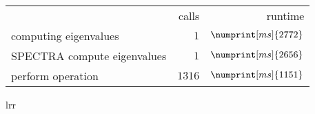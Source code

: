 \begin{tabular}{lrr}
	 & calls & runtime \\
	\hspace{0mm}computing eigenvalues & $1$ & $\numprint[ms]{2772}$ \\
	\hspace{5mm}SPECTRA compute eigenvalues & $1$ & $\numprint[ms]{2656}$ \\
	\hspace{10mm}perform operation & $1316$ & $\numprint[ms]{1151}$\end{tabular}{lrr}
